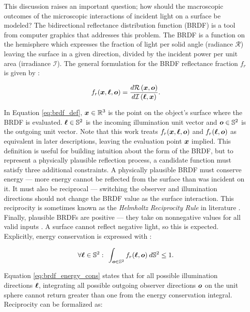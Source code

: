 This discussion raises an important question; how should the macroscopic outcomes of the microscopic interactions of incident light on a surface be modeled? The bidirectional reflectance distribution function (BRDF) is a tool from computer graphics that addresses this problem. The BRDF is a function on the hemisphere which expresses the fraction of light per solid angle (radiance $\mathcal{R}$) leaving the surface in a given direction, divided by the incident power per unit area (irradiance $\mathcal{I}$). The general formulation for the BRDF reflectance fraction $f_r$ is given by \cite{duvenhage2013}:

\begin{equation} \label{eq:brdf_def}
    f_r(\bm{x}, \bm{\ell}, \bm{o}) = \frac{d\mathcal{R}\left(\bm{x}, \bm{o}\right)}{d\mathcal{I}\left(\bm{\ell}, \bm{x}\right)}.
\end{equation}

In Equation \ref{eq:brdf_def}, $\bm{x} \in \mathbb{R}^3$ is the point on the object's surface where the BRDF is evaluated. $\bm{\ell} \in \mathbb{S}^2$ is the incoming illumination unit vector and $\bm{o} \in \mathbb{S}^2$ is the outgoing unit vector. Note that this work treats $f_r(\bm{x}, \bm{\ell}, \bm{o})$ and $f_r(\bm{\ell}, \bm{o})$ as equivalent in later descriptions, leaving the evaluation point $\bm{x}$ implied. This definition is useful for building intuition about the form of the BRDF, but to represent a physically plausible reflection process, a candidate function must satisfy three additional constraints. A physically plausible BRDF must conserve energy --- more energy cannot be reflected from the surface than was incident on it. It must also be reciprocal --- switching the observer and illumination directions should not change the BRDF value as the surface interaction. This reciprocity is sometimes known as the \textit{Helmholtz Reciprocity Rule} in literature \cite{montes2012}. Finally, plausible BRDFs are positive --- they take on nonnegative values for all valid inputs \cite{montes2012}. A surface cannot reflect negative light, so this is expected. Explicitly, energy conservation is expressed with \cite{montes2012}:

\begin{equation} \label{eq:brdf_energy_cons}
  \forall \bm{\ell} \in \mathbb{S}^2 : \:\: \int_{\bm{o} \in \mathbb{S}^2} f_r(\bm{\ell}, \bm{o}) \: d\mathbb{S}^2 \leq 1.
\end{equation}

Equation \ref{eq:brdf_energy_cons} states that for all possible illumination directions $\bm{\ell}$, integrating all possible outgoing observer directions $\bm{o}$ on the unit sphere cannot return greater than one from the energy conservation integral. Reciprocity can be formalized as:

